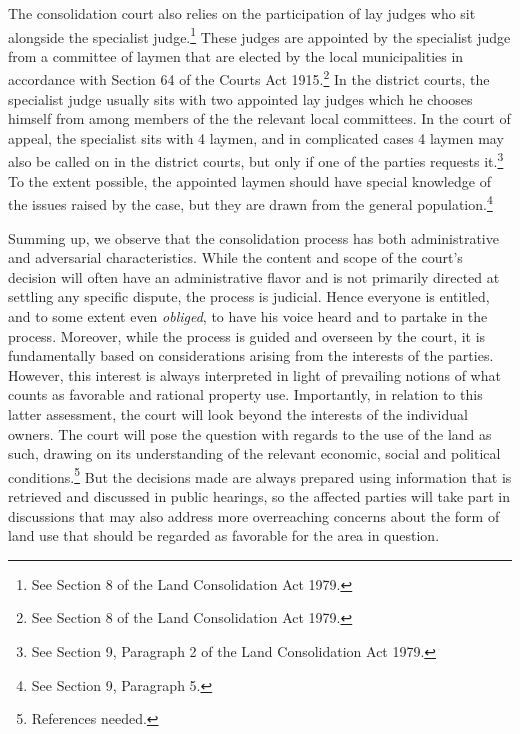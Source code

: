 The consolidation court also relies on the participation of lay judges who sit alongside the specialist judge.\footnote{See Section 8 of the Land Consolidation Act 1979.} These judges are appointed by the specialist judge from a committee of laymen that are elected by the local municipalities in accordance with Section 64 of the Courts Act 1915.\footnote{See Section 8 of the Land Consolidation Act 1979.} In the district courts, the specialist judge usually sits with two appointed lay judges which he chooses himself from among members of the the relevant local committees. In the court of appeal, the specialist sits with 4 laymen, and in complicated cases 4 laymen may also be called on in the district courts, but only if one of the parties requests it.\footnote{See Section 9, Paragraph 2 of the Land Consolidation Act 1979.} To the extent possible, the appointed laymen should have special knowledge of the issues raised by the case, but they are drawn from the general population.\footnote{See Section 9, Paragraph 5.}

Summing up, we observe that the consolidation process has both administrative and adversarial characteristics. While the content and scope of the court's decision will often have an administrative flavor and is not primarily directed at settling any specific dispute, the process is judicial. Hence everyone is entitled, and to some extent even \emph{obliged}, to have his voice heard and to partake in the process. Moreover, while the process is guided and overseen by the court, it is fundamentally based on considerations arising from the interests of the parties. However, this interest is always interpreted in light of prevailing notions of what counts as favorable and rational property use. Importantly, in relation to this latter assessment, the court will look beyond the interests of the individual owners. The court will pose the question with regards to the use of the land as such, drawing on its understanding of the relevant economic, social and political conditions.\footnote{References needed.} But the decisions made are always prepared using information that is retrieved and discussed in public hearings, so the affected parties will take part in discussions that may also address more overreaching concerns about the form of land use that should be regarded as favorable for the area in question.

